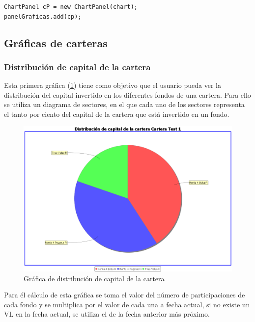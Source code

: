 \documentclass[12pt, a4paper]{book}
\begin{document}
\begin{verbatim}
ChartPanel cP = new ChartPanel(chart);
panelGraficas.add(cp);
\end{verbatim}
\newpage

\subsection{Gráficas de carteras}

\subsubsection{Distribución de capital de la cartera}

Esta primera gráfica (\ref{fig:distribucion}) tiene como objetivo que el usuario pueda ver la distribución del capital invertido en los diferentes fondos de una cartera. Para ello se utiliza un diagrama de sectores, en el que cada uno de los sectores representa el tanto por ciento del capital de la cartera que está invertido en un fondo.\\

	\begin{figure}[htbp]
	\centering
	\includegraphics[width=\textwidth]{figuras/distribucion.PNG}
	\caption{Gráfica de distribución de capital de la cartera}
	\label{fig:distribucion}
	\end {figure}
	
Para él cálculo de esta gráfica se toma el valor del número de participaciones de cada fondo y se multiplica por el valor de cada una a fecha actual, si no existe un \gls{VL} en la fecha actual, se utiliza el de la fecha anterior más próximo.\\
\newpage
\end{document}
